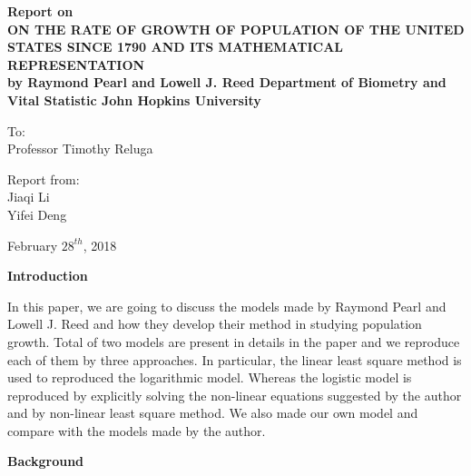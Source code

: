 \documentclass[a4paper]{article}
\begin{document}
\begin{center}

{\huge \textbf{Report on}} \\
\vspace{5mm}
{\huge \textbf{ON THE RATE OF GROWTH OF POPULATION OF THE UNITED STATES SINCE 1790 AND ITS MATHEMATICAL REPRESENTATION}} \\
\vspace{2.5mm}
{\Large \textbf{by Raymond Pearl and Lowell J. Reed  Department of Biometry and Vital Statistic  John Hopkins University}} \\

\vspace{40mm}

To: \\
Professor Timothy Reluga \\

\vspace{10mm}

Report from: \\
Jiaqi Li \\
Yifei Deng\\

\vspace{\fill}

February $28^{th}$, 2018

\clearpage

\textbf{\large{Introduction}} \\

\end{center}

In this paper, we are going to discuss the models made by Raymond Pearl and Lowell J. Reed and how they develop their method in studying population growth. Total of two models are present in details in the paper and we reproduce each of them by three approaches. In particular, the linear least square method is used to reproduced the logarithmic model. Whereas the logistic model is reproduced by explicitly solving the non-linear equations suggested by the author and by non-linear least square method. We also made our own model and compare with the models made by the author. \\

\vspace{10mm}

\begin{center}

\textbf{\large{Background}} \\

\end{center}
\end{document}
